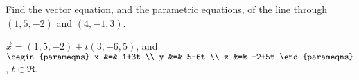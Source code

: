 
\begin{Exercise}[
name={},
title={}, 
difficulty=0,
origin={\cite{SM}}]
Find the vector equation, and the parametric equations, of the line through $(1,5,-2)$ and $(4,-1,3)$.

\end{Exercise}

\begin{Answer}
$\vec{x} = (1,5,-2)+t(3,-6,5)$, and $\begin{parameqns} x &=& 1+3t \\ y &=& 5-6t \\ z &=& -2+5t \end{parameqns}$, $t\in\Re$.
\end{Answer}
